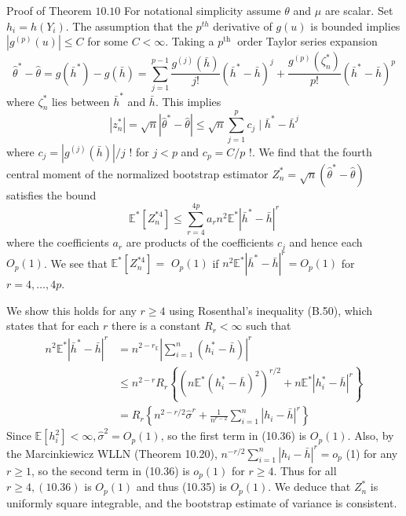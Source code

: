 \documentclass[10pt]{article}
\begin{document}
Proof of Theorem $10.10$ For notational simplicity assume $\theta$ and $\mu$ are scalar. Set $h_{i}=h\left(Y_{i}\right)$. The assumption that the $p^{t h}$ derivative of $g(u)$ is bounded implies $\left|g^{(p)}(u)\right| \leq C$ for some $C<\infty$. Taking a $p^{\text {th }}$ order Taylor series expansion
$$
\widehat{\theta}^{*}-\widehat{\theta}=g\left(\bar{h}^{*}\right)-g(\bar{h})=\sum_{j=1}^{p-1} \frac{g^{(j)}(\bar{h})}{j !}\left(\bar{h}^{*}-\bar{h}\right)^{j}+\frac{g^{(p)}\left(\zeta_{n}^{*}\right)}{p !}\left(\bar{h}^{*}-\bar{h}\right)^{p}
$$
where $\zeta_{n}^{*}$ lies between $\bar{h}^{*}$ and $\bar{h}$. This implies
$$
\left|z_{n}^{*}\right|=\sqrt{n}\left|\widehat{\theta}^{*}-\widehat{\theta}\right| \leq \sqrt{n} \sum_{j=1}^{p} c_{j} \mid \bar{h}^{*}-\bar{h}^{j}
$$
where $c_{j}=\left|g^{(j)}(\bar{h})\right| / j$ ! for $j<p$ and $c_{p}=C / p$ !. We find that the fourth central moment of the normalized bootstrap estimator $Z_{n}^{*}=\sqrt{n}\left(\widehat{\theta}^{*}-\widehat{\theta}\right)$ satisfies the bound
$$
\mathbb{E}^{*}\left[Z_{n}^{* 4}\right] \leq \sum_{r=4}^{4 p} a_{r} n^{2} \mathbb{E}^{*}\left|\bar{h}^{*}-\bar{h}\right|^{r}
$$
where the coefficients $a_{r}$ are products of the coefficients $c_{j}$ and hence each $O_{p}(1)$. We see that $\mathbb{E}^{*}\left[Z_{n}^{* 4}\right]=$ $O_{p}(1)$ if $n^{2} \mathbb{E}^{*}\left|\bar{h}^{*}-\bar{h}\right|^{r}=O_{p}(1)$ for $r=4, \ldots, 4 p$.

We show this holds for any $r \geq 4$ using Rosenthal's inequality (B.50), which states that for each $r$ there is a constant $R_{r}<\infty$ such that
$$
\begin{aligned}
n^{2} \mathbb{E}^{*}\left|\bar{h}^{*}-\bar{h}\right|^{r} &=n^{2-r_{\mathbb{E}}}\left|\sum_{i=1}^{n}\left(h_{i}^{*}-\bar{h}\right)\right|^{r} \\
& \leq n^{2-r} R_{r}\left\{\left(n \mathbb{E}^{*}\left(h_{i}^{*}-\bar{h}\right)^{2}\right)^{r / 2}+n \mathbb{E}^{*}\left|h_{i}^{*}-\bar{h}\right|^{r}\right\} \\
&=R_{r}\left\{n^{2-r / 2} \widehat{\sigma}^{r}+\frac{1}{n^{r-2}} \sum_{i=1}^{n}\left|h_{i}-\bar{h}\right|^{r}\right\}
\end{aligned}
$$
Since $\mathbb{E}\left[h_{i}^{2}\right]<\infty, \widehat{\sigma}^{2}=O_{p}(1)$, so the first term in (10.36) is $O_{p}(1)$. Also, by the Marcinkiewicz WLLN (Theorem 10.20), $n^{-r / 2} \sum_{i=1}^{n}\left|h_{i}-\bar{h}\right|^{r}=o_{p}$ (1) for any $r \geq 1$, so the second term in (10.36) is $o_{p}(1)$ for $r \geq 4$. Thus for all $r \geq 4,(10.36)$ is $O_{p}(1)$ and thus (10.35) is $O_{p}(1)$. We deduce that $Z_{n}^{*}$ is uniformly square integrable, and the bootstrap estimate of variance is consistent.
\end{document}
